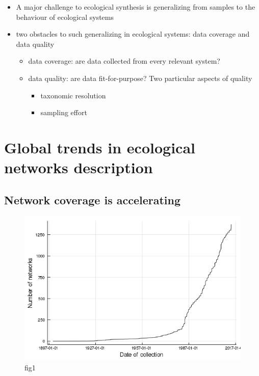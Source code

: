\begin{itemize}
\tightlist
\item
  A major challenge to ecological synthesis is generalizing from samples
  to the behaviour of ecological systems
\item
  two obstacles to such generalizing in ecological systems: data
  coverage and data quality

  \begin{itemize}
  \tightlist
  \item
    data coverage: are data collected from every relevant system?
  \item
    data quality: are data fit-for-purpose? Two particular aspects of
    quality

    \begin{itemize}
    \tightlist
    \item
      taxonomic resolution
    \item
      sampling effort
    \end{itemize}
  \end{itemize}
\end{itemize}

\hypertarget{global-trends-in-ecological-networks-description}{%
\section{Global trends in ecological networks
description}\label{global-trends-in-ecological-networks-description}}

\hypertarget{network-coverage-is-accelerating}{%
\subsection{Network coverage is
accelerating}\label{network-coverage-is-accelerating}}

\begin{figure}
\centering
\includegraphics{figures/figure_01_a.png}
\caption{fig1\label{fig:temporal}}
\end{figure}

